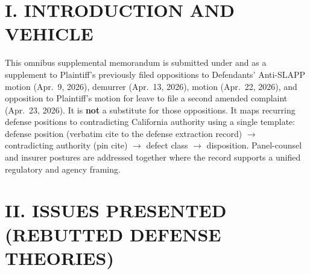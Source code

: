 \newcommand{\docshorttitle}{OMNIBUS SUPPL.\ P\&A --- BLACK-LETTER CONTRADICTIONS (CGC-25-631801)}
\newcommand{\doctitleblock}{PLAINTIFF'S OMNIBUS SUPPL.\ P\&A --- BLACK-LETTER CONTRADICTIONS (MULTI-MOTION DOCKET)}
\newcommand{\docsubblock}{(Cal.\ Rules of Court, rules 3.1113, 3.1306(c); supplemental only; cross-noticed hearings on caption.)}




\section*{I. INTRODUCTION AND VEHICLE}

This omnibus supplemental memorandum is submitted under  and  as a supplement to Plaintiff's previously filed oppositions to Defendants' Anti-SLAPP motion (Apr.\ 9, 2026), demurrer (Apr.\ 13, 2026),  motion (Apr.\ 22, 2026), and opposition to Plaintiff's motion for leave to file a second amended complaint (Apr.\ 23, 2026). It is \textbf{not} a substitute for those oppositions. It maps recurring defense positions to contradicting California authority using a single template: defense position (verbatim cite to the defense extraction record) $\rightarrow$ contradicting authority (pin cite) $\rightarrow$ defect class $\rightarrow$ disposition. Panel-counsel and insurer postures are addressed together where the record supports a unified regulatory and agency framing.

\section*{II. ISSUES PRESENTED (REBUTTED DEFENSE THEORIES)}

